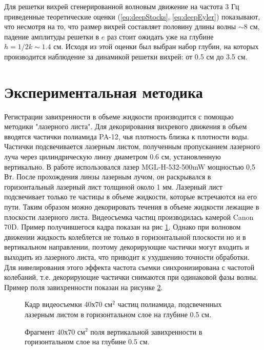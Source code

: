 Для решетки вихрей сгенерированной волновым движение на частота 3 Гц приведенные теоретические оценки (\ref{eq:deepStocks}, \ref{eq:deepEyler}) показывают, что несмотря на то, что размер вихрей составляет половину длины волны $\sim 8$ см, падение амплитуды решетки в $e$ раз стоит ожидать уже на глубине $h = 1/2k \sim 1.4$ см. Исходя из этой оценки был выбран набор глубин, на которых производится наблюдение за динамикой решетки вихрей: от 0.5 см до 3.5 см.

\section{Экспериментальная методика} \label{sect6_2}
Регистрации завихренности в объеме жидкости производится с помощью методики "лазерного листа". Для декорирования вихревого движения в объем вводятся частички полиамида PA-12, чья плотность близка к плотности воды. Частички подсвечивается лазерным листом, полученным пропусканием лазерного луча через цилиндрическую линзу диаметром 0.6 см, установленную вертикально. В работе использовался лазер MGL-H-532-500mW мощностью 0,5 Вт. После прохождения линзы лазерным лучом, он раскрывался в горизонтальный лазерный лист толщиной около 1 мм. Лазерный лист подсвечивает только те частицы в объеме жидкости, которые встречаются на его пути. Таким образом можно декорировать течения в объеме жидкости лежащие в плоскости лазерного листа. Видеосъемка частиц производилась камерой Canon 70D. Пример получившегося кадра показан на рис \ref{img:track0p5cm}. Однако при волновом движении жидкость колеблется не только в горизонтальной плоскости но и в вертикальном направлении, поэтому декорирующие частички могут входить и выходить из лазерного листа, что приводит к ухудшению точности обработки. Для нивелирования этого эффекта частота съемки синхронизирована с частотой колебаний, т.е. декорирующие частички снимаются при одинаковой фазы волны. Пример поля завихренности показан на рисунке \ref{img:vort0p5cm}.
\begin{figure}[ht]
 \caption{Кадр видеосъемки 40х70 см$^2$ частиц полиамида, подсвеченных лазерным листом в горизонтальном слое на глубине 0.5 см.}
 \label{img:track0p5cm} 
\end{figure}

\begin{figure}[ht]
 \caption{Фрагмент 40х70 см$^2$ поля вертикальной завихренности в горизонтальном слое на глубине 0.5 см.}
 \label{img:vort0p5cm} 
\end{figure}


